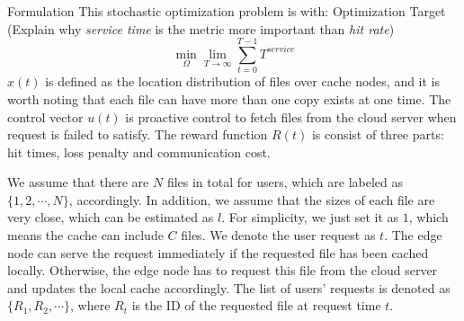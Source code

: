 \documentclass{article}
\begin{document}
\begin{section}{Formulation}
    This stochastic optimization problem is with:
    Optimization Target (Explain why \emph{service time} is the metric more important than \emph{hit rate})
    $$
        \min_{\Omega}\lim_{T \to \infty} \sum_{t=0}^{T-1} T^{service}
    $$
    $x(t)$ is defined as the location distribution of files over cache nodes, and it is worth noting that each file can have more than one copy exists at one time. The control vector $u(t)$ is proactive control to fetch files from the cloud server when request is failed to satisfy. The reward function $R(t)$ is consist of three parts: hit times, loss penalty and communication cost.

    We assume that there are $N$ files in total for users, which are labeled as $\{1,2,\cdots,N\}$, accordingly. In addition, we assume that the sizes of each file are very close, which can be estimated as $l$. For simplicity, we just set it as $1$, which means the cache can include $C$ files. We denote the user request as $t$. The edge node can serve the request immediately if the requested file has been cached locally. Otherwise, the edge node has to request this file from the cloud server and updates the local cache accordingly. The list of users' requests is denoted as $\{R_1,R_2,\cdots\}$, where $R_t$ is the ID of the requested file at request time $t$.
\end{section}
\end{document}
